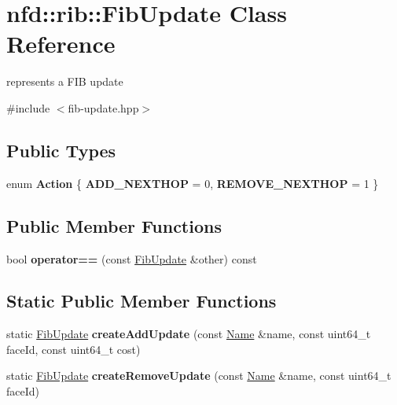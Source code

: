 \hypertarget{classnfd_1_1rib_1_1FibUpdate}{}\section{nfd\+:\+:rib\+:\+:Fib\+Update Class Reference}
\label{classnfd_1_1rib_1_1FibUpdate}


represents a F\+IB update  




{\ttfamily \#include $<$fib-\/update.\+hpp$>$}

\subsection*{Public Types}
\begin{DoxyCompactItemize}
\item 
enum {\bfseries Action} \{ {\bfseries A\+D\+D\+\_\+\+N\+E\+X\+T\+H\+OP} = 0, 
{\bfseries R\+E\+M\+O\+V\+E\+\_\+\+N\+E\+X\+T\+H\+OP} = 1
 \}\hypertarget{classnfd_1_1rib_1_1FibUpdate_a13ef2c5b7b067f325e0d4e674bba8b0a}{}\label{classnfd_1_1rib_1_1FibUpdate_a13ef2c5b7b067f325e0d4e674bba8b0a}

\end{DoxyCompactItemize}
\subsection*{Public Member Functions}
\begin{DoxyCompactItemize}
\item 
bool {\bfseries operator==} (const \hyperlink{classnfd_1_1rib_1_1FibUpdate}{Fib\+Update} \&other) const\hypertarget{classnfd_1_1rib_1_1FibUpdate_ab70f5ee7040cfe879f19144a162793ce}{}\label{classnfd_1_1rib_1_1FibUpdate_ab70f5ee7040cfe879f19144a162793ce}

\end{DoxyCompactItemize}
\subsection*{Static Public Member Functions}
\begin{DoxyCompactItemize}
\item 
static \hyperlink{classnfd_1_1rib_1_1FibUpdate}{Fib\+Update} {\bfseries create\+Add\+Update} (const \hyperlink{classndn_1_1Name}{Name} \&name, const uint64\+\_\+t face\+Id, const uint64\+\_\+t cost)\hypertarget{classnfd_1_1rib_1_1FibUpdate_a7e1620d21bb4c6152cb5a43f7fe4ebc8}{}\label{classnfd_1_1rib_1_1FibUpdate_a7e1620d21bb4c6152cb5a43f7fe4ebc8}

\item 
static \hyperlink{classnfd_1_1rib_1_1FibUpdate}{Fib\+Update} {\bfseries create\+Remove\+Update} (const \hyperlink{classndn_1_1Name}{Name} \&name, const uint64\+\_\+t face\+Id)\hypertarget{classnfd_1_1rib_1_1FibUpdate_a405c1ef83d6be84287c2a418a056f42c}{}\label{classnfd_1_1rib_1_1FibUpdate_a405c1ef83d6be84287c2a418a056f42c}

\end{DoxyCompactItemize}
